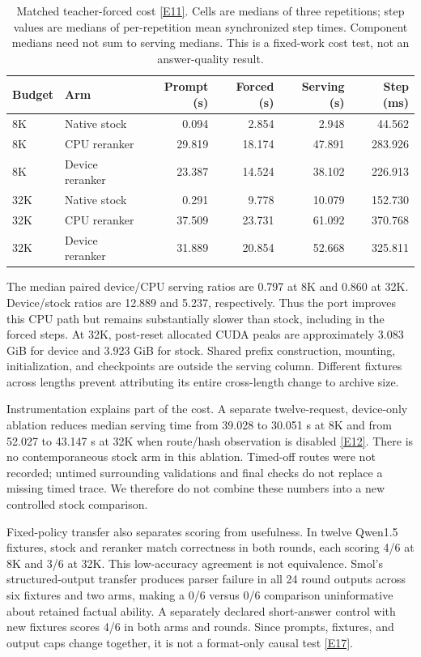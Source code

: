 \documentclass[11pt,letterpaper]{article}
\newcommand{\ev}[1]{\hyperref[app:evidence]{[E#1]}}
\begin{document}
\begin{table}[ht]
\centering\small
\begin{tabular}{llrrrr}
\toprule
Budget & Arm & Prompt (s) & Forced (s) & Serving (s) & Step (ms)\\\midrule
8K & Native stock & 0.094 & 2.854 & 2.948 & 44.562\\
8K & CPU reranker & 29.819 & 18.174 & 47.891 & 283.926\\
8K & Device reranker & 23.387 & 14.524 & 38.102 & 226.913\\
32K & Native stock & 0.291 & 9.778 & 10.079 & 152.730\\
32K & CPU reranker & 37.509 & 23.731 & 61.092 & 370.768\\
32K & Device reranker & 31.889 & 20.854 & 52.668 & 325.811\\\bottomrule
\end{tabular}
\caption{Matched teacher-forced cost \ev{11}. Cells are medians of three repetitions; step values are medians of per-repetition mean synchronized step times. Component medians need not sum to serving medians. This is a fixed-work cost test, not an answer-quality result.}\label{tab:cost}
\end{table}

The median paired device/CPU serving ratios are 0.797 at 8K and 0.860 at 32K. Device/stock ratios are 12.889 and 5.237, respectively. Thus the port improves this CPU path but remains substantially slower than stock, including in the forced steps. At 32K, post-reset allocated CUDA peaks are approximately 3.083 GiB for device and 3.923 GiB for stock. Shared prefix construction, mounting, initialization, and checkpoints are outside the serving column. Different fixtures across lengths prevent attributing its entire cross-length change to archive size.

Instrumentation explains part of the cost. A separate twelve-request, device-only ablation reduces median serving time from 39.028 to 30.051 s at 8K and from 52.027 to 43.147 s at 32K when route/hash observation is disabled \ev{12}. There is no contemporaneous stock arm in this ablation. Timed-off routes were not recorded; untimed surrounding validations and final checks do not replace a missing timed trace. We therefore do not combine these numbers into a new controlled stock comparison.

Fixed-policy transfer also separates scoring from usefulness. In twelve Qwen1.5 fixtures, stock and reranker match correctness in both rounds, each scoring 4/6 at 8K and 3/6 at 32K. This low-accuracy agreement is not equivalence. Smol's structured-output transfer produces parser failure in all 24 round outputs across six fixtures and two arms, making a 0/6 versus 0/6 comparison uninformative about retained factual ability. A separately declared short-answer control with new fixtures scores 4/6 in both arms and rounds. Since prompts, fixtures, and output caps change together, it is not a format-only causal test \ev{17}.
\end{document}

